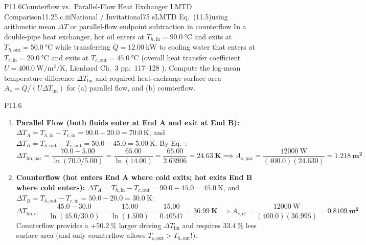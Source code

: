 \begin{problem}{P11.6}{Counterflow vs.\ Parallel-Flow Heat Exchanger LMTD Comparison}{11.2}{5.c.iii}{National / Invitational}{75 s}{LMTD Eq.\ (11.5)}{using arithmetic mean $\Delta T$ or parallel-flow endpoint subtraction in counterflow}
In a double-pipe heat exchanger, hot oil enters at $T_{h,\mathrm{in}} = \SI{90.0}{\celsius}$ and exits at $T_{h,\mathrm{out}} = \SI{50.0}{\celsius}$ while transferring $\dot{Q} = \SI{12.00}{\kilo\watt}$ to cooling water that enters at $T_{c,\mathrm{in}} = \SI{20.0}{\celsius}$ and exits at $T_{c,\mathrm{out}} = \SI{45.0}{\celsius}$ (overall heat transfer coefficient $U = \SI{400.0}{\watt\per\square\meter\per\kelvin}$, Lienhard Ch.~3 pp.~117--128 ). Compute the log-mean temperature difference $\Delta T_{\mathrm{lm}}$ and required heat-exchange surface area $A_s = \dot{Q}/(U\Delta T_{\mathrm{lm}})$ for (a) parallel flow, and (b) counterflow.
\end{problem}
\begin{solution}{P11.6}
\begin{enumerate}
  \item[(a)] \textbf{Parallel Flow (both fluids enter at End A and exit at End B):} $\Delta T_A = T_{h,\mathrm{in}} - T_{c,\mathrm{in}} = 90.0 - 20.0 = \SI{70.0}{\kelvin}$, and $\Delta T_B = T_{h,\mathrm{out}} - T_{c,\mathrm{out}} = 50.0 - 45.0 = \SI{5.00}{\kelvin}$. By Eq.~:
  \[
    \Delta T_{\mathrm{lm,par}} = \frac{70.0 - 5.00}{\ln(70.0/5.00)} = \frac{65.00}{\ln(14.00)} = \frac{65.00}{2.63906} = \mathbf{\SI{24.63}{\kelvin}} \implies A_{s,\mathrm{par}} = \frac{\SI{12000}{\watt}}{(400.0)(24.630)} = \mathbf{\SI{1.218}{\square\meter}}
  \]
  \item[(b)] \textbf{Counterflow (hot enters End A where cold exits; hot exits End B where cold enters):} $\Delta T_A = T_{h,\mathrm{in}} - T_{c,\mathrm{out}} = 90.0 - 45.0 = \SI{45.0}{\kelvin}$, and $\Delta T_B = T_{h,\mathrm{out}} - T_{c,\mathrm{in}} = 50.0 - 20.0 = \SI{30.0}{\kelvin}$:
  \[
    \Delta T_{\mathrm{lm,cf}} = \frac{45.0 - 30.0}{\ln(45.0/30.0)} = \frac{15.00}{\ln(1.500)} = \frac{15.00}{0.40547} = \mathbf{\SI{36.99}{\kelvin}} \implies A_{s,\mathrm{cf}} = \frac{\SI{12000}{\watt}}{(400.0)(36.995)} = \mathbf{\SI{0.8109}{\square\meter}}
  \]
  Counterflow provides a $+\SI{50.2}{\percent}$ larger driving $\Delta T_{\mathrm{lm}}$ and requires $\SI{33.4}{\percent}$ less surface area (and only counterflow allows $T_{c,\mathrm{out}} > T_{h,\mathrm{out}}$!).
\end{enumerate}
\end{solution}

